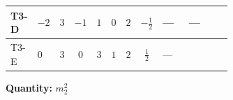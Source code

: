 \documentclass[8pt]{article}
\begin{document}
\begin{landscape}
\begin{longtable}{@{}llcccccc >{\raggedright\arraybackslash}p{0.21\linewidth} >{\raggedright\arraybackslash}p{0.21\linewidth} >{\raggedright\arraybackslash}p{0.21\linewidth}@{}}
\midrule
T3-D & $-2$ & $3$ & $-1$ & $1$ & $0$ & $2$ & $-\frac{1}{2}$ & --- & --- & \scriptsize\adjustbox{max width=\linewidth}{$\begin{gathered} -8 \operatorname{Tr}\!\left({M_F}\,\left({y_2}\right)^{\dagger}\,{y_2}\,\left({M_F}\right)^{\dagger}\right)\end{gathered}$} \\
\midrule
T3-E & $0$ & $3$ & $0$ & $3$ & $1$ & $2$ & $\frac{1}{2}$ & --- & \scriptsize\adjustbox{max width=\linewidth}{$\begin{gathered} {m_2^2} (2 T_{\nu}^{(2)}+8 {\lambda_{S_2}^{(1)}}+4 {\lambda_{S_2}^{(A)}})\end{gathered}$} & \scriptsize\adjustbox{max width=\linewidth}{$\begin{gathered} -4 \operatorname{Tr}\!\left({M_F}\,\left({y_2}\right)^{\dagger}\,{y_2}\,\left({M_F}\right)^{\dagger}\right)\end{gathered}$} \\
\midrule
\bottomrule
\end{longtable}
\clearpage
\noindent\textbf{Quantity: }$m_2^2$\par\smallskip

\end{landscape}
\end{document}
